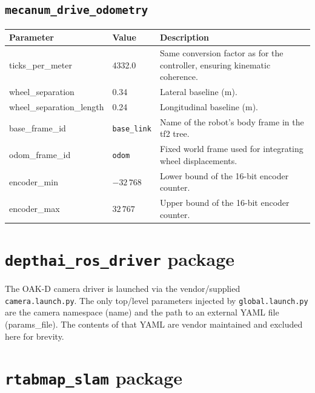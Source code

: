 \subsection{\texttt{mecanum\_drive\_odometry}}

\begin{longtable}{@{}lll@{}}
\toprule
\textbf{Parameter} & \textbf{Value} & \textbf{Description} \\
\midrule
ticks\_per\_meter          & 4332.0 & Same conversion factor as for the controller, ensuring kinematic coherence. \\
wheel\_separation          & 0.34   & Lateral baseline (m). \\
wheel\_separation\_length  & 0.24   & Longitudinal baseline (m). \\
base\_frame\_id            & \texttt{base\_link} & Name of the robot's body frame in the \textsf{tf2} tree. \\
odom\_frame\_id            & \texttt{odom}       & Fixed world frame used for integrating wheel displacements. \\
encoder\_min               & $-32\,768$ & Lower bound of the 16-bit encoder counter. \\
encoder\_max               & $32\,767$  & Upper bound of the 16-bit encoder counter. \\
\bottomrule
\end{longtable}

\section{\texttt{depthai\_ros\_driver} package}
The OAK-D camera driver is launched via the vendor/supplied
\texttt{camera.launch.py}. The only top/level parameters injected by
\texttt{global.launch.py} are the camera namespace (name) and the
path to an external YAML file (params\_file). The contents of that
YAML are vendor maintained and excluded here for brevity.

\section{\texttt{rtabmap\_slam} package}

